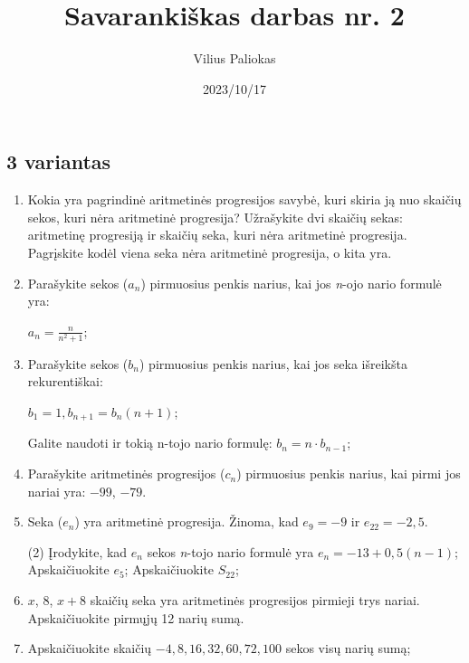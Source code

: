 \documentclass[a4paper]{article}
\title{Savarankiškas darbas nr. 2}
\author{Vilius Paliokas}
\date{2023/10/17}
\begin{document}
\thispagestyle{fancy}

\subsection*{3 variantas}

\begin{enumerate}
      \item Kokia yra pagrindinė aritmetinės progresijos savybė, kuri skiria ją
            nuo skaičių sekos, kuri nėra aritmetinė progresija? Užrašykite dvi
            skaičių sekas: aritmetinę progresiją ir skaičių seka, kuri nėra
            aritmetinė progresija. Pagrįskite kodėl viena seka nėra
            aritmetinė progresija, o kita yra.

      \item Parašykite sekos ($a_{n}$) pirmuosius penkis
            narius, kai jos \textit{n}-ojo nario formulė yra:

            $a_{n}=\frac{n}{n^{2} + 1}$;

      \item Parašykite sekos ($b_{n}$) pirmuosius penkis
            narius, kai jos seka išreikšta rekurentiškai:

            $b_1 = 1, b_{n+1}=b_{n}(n+1)$;

            Galite naudoti ir tokią n-tojo nario formulę: $b_{n}=n \cdot
                  b_{n-1}$;

      \item Parašykite aritmetinės progresijos ($c_{n}$) pirmuosius penkis
            narius, kai pirmi jos nariai yra: $-99$, $-79$.

      \item Seka ($e_{n}$) yra aritmetinė progresija. Žinoma, kad $e_{9}=-9$ ir
            $e_{22}=-2,5$.

            \begin{tasks}[item-format={\normalfont}, after-item-skip=2mm](2)
                  \task* Įrodykite, kad $e_{n}$ sekos \textit{n}-tojo nario
                  formulė yra $e_{n}=-13+0,5(n-1)$;
                  \task Apskaičiuokite $e_{5}$;
                  \task Apskaičiuokite $S_{22}$;
            \end{tasks}

      \item $ x $, $ 8 $, $ x + 8$ skaičių seka yra aritmetinės progresijos
            pirmieji trys nariai. Apskaičiuokite pirmųjų 12 narių sumą.

      \item Apskaičiuokite skaičių $ -4, 8, 16, 32, 60, 72, 100 $ sekos visų narių sumą;


\end{enumerate}
\end{document}
